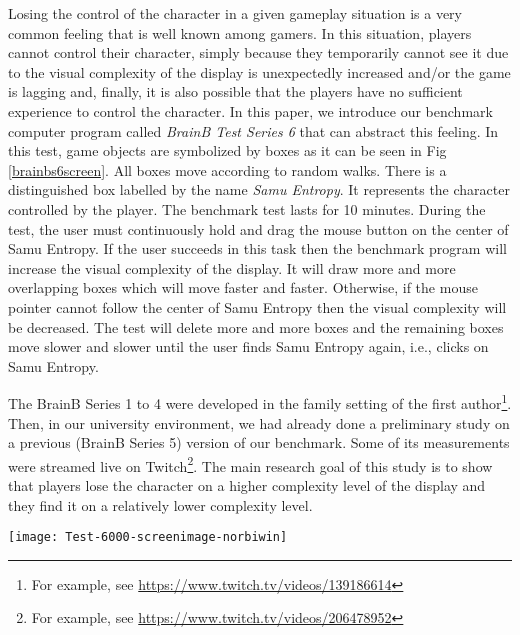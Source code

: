 Losing the control of the character in a given gameplay situation is a very common feeling that is well known among gamers. In this situation, players cannot control their character, simply because they temporarily cannot see it due to the visual complexity of the display is unexpectedly increased and/or the game is lagging and, finally, it is also possible that the players have no sufficient experience to control the character. 
In this paper, we introduce our benchmark computer program called \textit{BrainB Test Series 6} that can abstract this feeling. In this test, game objects are symbolized by boxes as it can be seen in Fig \ref{brainbs6screen}. All boxes move according to random walks. There is a distinguished box labelled by the name \textit{Samu Entropy}. It represents the character controlled by the player. 
The benchmark test lasts for 10 minutes. 
During the test, the user must continuously hold and drag the mouse button on the center of Samu Entropy. 
If the user succeeds in this task then the benchmark program will increase the visual complexity of the display. It will draw more and more overlapping boxes which will move faster and faster. Otherwise, if the mouse pointer cannot follow the center of Samu Entropy then the visual complexity will be decreased. The test will delete more and more boxes and the remaining boxes move slower 
and slower until the user finds Samu Entropy again, i.e., clicks on Samu Entropy.

The BrainB Series 1 to 4 were developed in the family setting of the first author\footnote{For example, see \url{https://www.twitch.tv/videos/139186614}}. 
Then, in our university environment, 
we had already done a preliminary study \cite{brainbs5} on a previous (BrainB Series 5) version of our benchmark. Some of its measurements were streamed live on Twitch\footnote{For example, see \url{https://www.twitch.tv/videos/206478952}}. 
The main research goal of this study is to show that players lose the character on a higher complexity level of the display and they find it on a relatively lower complexity level.

\begin{figure*}
  \centering
    \texttt{[image: Test-6000-screenimage-norbiwin]}
  \caption{A screenshot of BrainB Test Series 6 in action. Can you find the box labelled by the name Samu Entropy in this picture?}
  \label{brainbs6screen}
\end{figure*}
